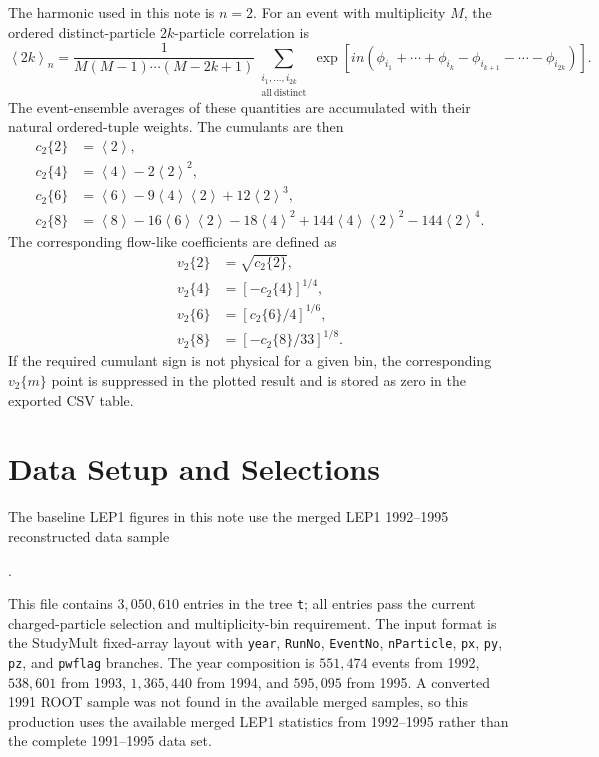 \documentclass{article}
\newcommand{\vn}[2]{\ensuremath{v_{#1}\{#2\}}}
\newcommand{\cn}[2]{\ensuremath{c_{#1}\{#2\}}}
\newcommand{\avg}[1]{\ensuremath{\left\langle #1 \right\rangle}}
\begin{document}
The harmonic used in this note is \(n=2\). For an event with multiplicity
\(M\), the ordered distinct-particle \(2k\)-particle correlation is
\begin{equation}
  \avg{2k}_{n}
  =
  \frac{1}{M(M-1)\cdots(M-2k+1)}
  \sum_{\substack{i_1,\ldots,i_{2k}\\ \mathrm{all~distinct}}}
  \exp\left[
    in\left(\phi_{i_1}+\cdots+\phi_{i_k}
    -\phi_{i_{k+1}}-\cdots-\phi_{i_{2k}}\right)
  \right].
  \label{eq:ordered-correlation}
\end{equation}
The event-ensemble averages of these quantities are accumulated with their
natural ordered-tuple weights. The cumulants are then
\begin{align}
  \cn{2}{2} &= \avg{2}, \\
  \cn{2}{4} &= \avg{4} - 2\avg{2}^2, \\
  \cn{2}{6} &= \avg{6} - 9\avg{4}\avg{2} + 12\avg{2}^3, \\
  \cn{2}{8} &= \avg{8} - 16\avg{6}\avg{2} - 18\avg{4}^2
              + 144\avg{4}\avg{2}^2 - 144\avg{2}^4 .
  \label{eq:cumulants}
\end{align}
The corresponding flow-like coefficients are defined as
\begin{align}
  \vn{2}{2} &= \sqrt{\cn{2}{2}}, \\
  \vn{2}{4} &= \left[-\cn{2}{4}\right]^{1/4}, \\
  \vn{2}{6} &= \left[\cn{2}{6}/4\right]^{1/6}, \\
  \vn{2}{8} &= \left[-\cn{2}{8}/33\right]^{1/8}.
  \label{eq:vndefs}
\end{align}
If the required cumulant sign is not physical for a given bin, the
corresponding \(\vn{2}{m}\) point is suppressed in the plotted result and is
stored as zero in the exported CSV table.

\section{Data Setup and Selections}
\label{sec:data}

The baseline LEP1 figures in this note use the merged LEP1 1992--1995
reconstructed data sample
\begin{center}
.
\end{center}
This file contains \(3{,}050{,}610\) entries in the tree \texttt{t}; all entries
pass the current charged-particle selection and multiplicity-bin requirement.
The input format is the StudyMult fixed-array layout with \texttt{year},
\texttt{RunNo}, \texttt{EventNo}, \texttt{nParticle}, \texttt{px}, \texttt{py},
\texttt{pz}, and \texttt{pwflag} branches. The year composition is
\(551{,}474\) events from 1992, \(538{,}601\) from 1993, \(1{,}365{,}440\) from
1994, and \(595{,}095\) from 1995. A converted 1991 ROOT sample was not found in
the available merged samples, so this production uses the available merged LEP1
statistics from 1992--1995 rather than the complete 1991--1995 data set.
\end{document}

